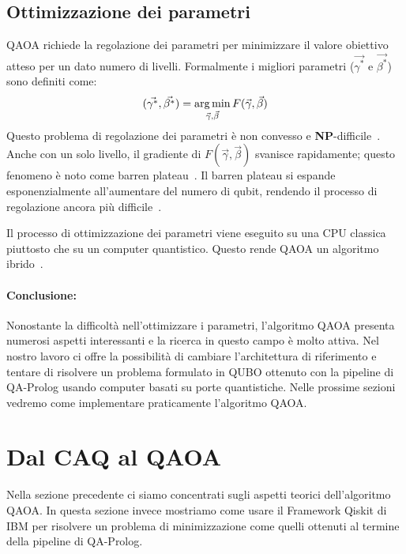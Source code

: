 \subsection{Ottimizzazione dei parametri}
\label{sec:param_opt}
QAOA richiede la regolazione dei parametri per minimizzare il valore obiettivo atteso per un dato numero di livelli. Formalmente i migliori parametri ($\vec{\gamma^*}$ e $\vec{\beta^*}$) sono definiti come:
\begin{equation}
	(\vec{\gamma^*},\vec{\beta^*}) = \operatorname*{arg\,min}_{\vec{\gamma},\vec{\beta}} F(\vec{\gamma},\vec{\beta}) 
	\label{eqn:optimized}
\end{equation}
Questo problema di regolazione dei parametri è non convesso e \textbf{NP}-difficile~\cite{fakhimi2023quantum}. Anche con un solo livello, il gradiente di $F(\vec{\gamma},\vec{\beta})$ svanisce rapidamente; questo fenomeno è noto come barren plateau~\cite{arrasmith2021effect, mcclean2018barren}. Il barren plateau si espande esponenzialmente all'aumentare del numero di qubit, rendendo il processo di regolazione ancora più difficile~\cite{mcclean2018barren}.

Il processo di ottimizzazione dei parametri viene eseguito su una CPU classica piuttosto che su un computer quantistico. Questo rende QAOA un algoritmo ibrido~\cite{fakhimi2023quantum}.

\paragraph{Conclusione:} Nonostante la difficoltà nell'ottimizzare i parametri, l'algoritmo QAOA presenta numerosi aspetti interessanti e la ricerca in questo campo è molto attiva. Nel nostro lavoro ci offre la possibilità di cambiare l'architettura di riferimento e tentare di risolvere un problema formulato in QUBO \textemdash{}ottenuto con la pipeline di QA-Prolog\textemdash{} usando computer basati su porte quantistiche. Nelle prossime sezioni vedremo come implementare praticamente l'algoritmo QAOA.

\section{Dal CAQ al QAOA}
Nella sezione precedente ci siamo concentrati sugli aspetti teorici dell'algoritmo QAOA. In questa sezione invece mostriamo come usare il Framework Qiskit di IBM per risolvere un problema di minimizzazione come quelli ottenuti al termine della pipeline di QA-Prolog.

